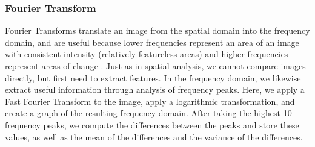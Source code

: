 
\subsubsection{Fourier Transform}

Fourier Transforms translate an image from the spatial domain into the frequency domain, and are useful because lower frequencies represent an area of an image with consistent intensity (relatively featureless areas) and higher frequencies represent areas of change \cite{Haas_2011}. Just as in spatial analysis, we cannot compare images directly, but first need to extract features. In the frequency domain, we likewise extract useful information through analysis of frequency peaks. Here, we apply a Fast Fourier Transform to the image, apply a logarithmic transformation, and create a graph of the resulting frequency domain. After taking the highest 10 frequency peaks, we compute the differences between the peaks and store these values, as well as the mean of the differences and the variance of the differences. 

    
  
  
  
  